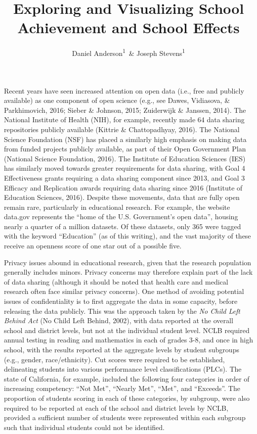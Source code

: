 \documentclass[man, fleqn, noextraspace]{apa6}
\title{Exploring and Visualizing School Achievement and School Effects}
\author{Daniel Anderson\textsuperscript{1}~\& Joseph Stevens\textsuperscript{1}}
\affiliation{
    \vspace{0.5cm}
          \textsuperscript{1} University of Oregon  }
\theoremstyle{definition}
\theoremstyle{definition}
\theoremstyle{definition}
\theoremstyle{remark}
\begin{document}
\maketitle

\setcounter{secnumdepth}{0}



Recent years have seen increased attention on open data (i.e., free and
publicly available) as one component of open science (e.g., see Dawes,
Vidiasova, \& Parkhimovich, 2016; Sieber \& Johnson, 2015; Zuiderwijk \&
Janssen, 2014). The National Institute of Health (NIH), for example,
recently made 64 data sharing repositories publicly available (Kittrie
\& Chattopadhyay, 2016). The National Science Foundation (NSF) has
placed a similarly high emphasis on making data from funded projects
publicly available, as part of their Open Government Plan (National
Science Foundation, 2016). The Institute of Education Sciences (IES) has
similarly moved towards greater requirements for data sharing, with Goal
4 Effectiveness grants requiring a data sharing component since 2013,
and Goal 3 Efficacy and Replication awards requiring data sharing since
2016 (Institute of Education Sciences, 2016). Despite these movements,
data that are fully open remain rare, particularly in educational
research. For example, the website data.gov represents the \enquote{home
of the U.S. Government's open data}, housing nearly a quarter of a
million datasets. Of these datasets, only 365 were tagged with the
keyword \enquote{Education} (as of this writing), and the vast majority
of these receive an openness score of one star out of a possible five.

Privacy issues abound in educational research, given that the research
population generally includes minors. Privacy concerns may therefore
explain part of the lack of data sharing (although it should be noted
that health care and medical research often face similar privacy
concerns). One method of avoiding potential issues of confidentiality is
to first aggregate the data in some capacity, before releasing the data
publicly. This was the approach taken by the \emph{No Child Left Behind
Act} (No Child Left Behind, 2002), with data reported at the overall
school and district levels, but not at the individual student level.
NCLB required annual testing in reading and mathematics in each of
grades 3-8, and once in high school, with the results reported at the
aggregate levels by student subgroups (e.g., gender, race/ethnicity).
Cut scores were required to be established, delineating students into
various performance level classifications (PLCs). The state of
California, for example, included the following four categories in order
of increasing competency: \enquote{Not Met}, \enquote{Nearly Met},
\enquote{Met}, and \enquote{Exceeds}. The proportion of students scoring
in each of these categories, by subgroup, were also required to be
reported at each of the school and district levels by NCLB, provided a
sufficient number of students were represented within each subgroup such
that individual students could not be identified.
\end{document}
